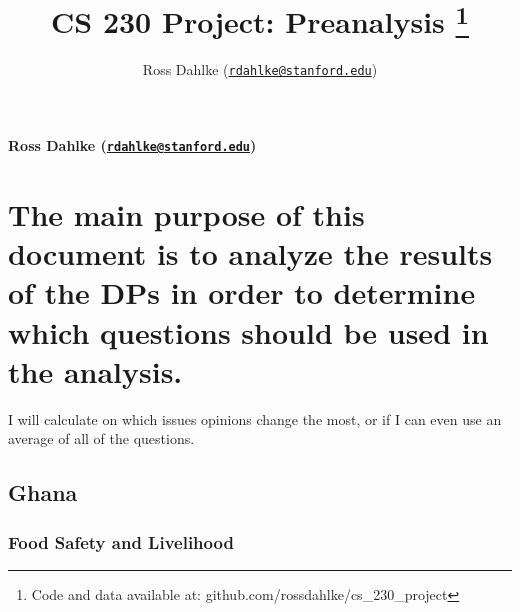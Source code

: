 \documentclass[12pt,]{article}
\title{CS 230 Project: Preanalysis \thanks{Code and data available at: github.com/rossdahlke/cs\_230\_project}  }
\author{\Large Ross Dahlke
(\href{mailto:rdahlke@stanford.edu}{\nolinkurl{rdahlke@stanford.edu}})\vspace{0.05in} \newline\normalsize\emph{}  }
\date{}
\newcommand*{\authorfont}{\fontfamily{phv}\selectfont}
\begin{document}
	
%

{%
\setlength{\parindent}{0pt}
\thispagestyle{plain}
{\fontsize{18}{20}\selectfont\raggedright 
\maketitle  %

}

{
   \vskip 13.5pt\relax \normalsize\fontsize{11}{12} 
\textbf{\authorfont Ross Dahlke
(\href{mailto:rdahlke@stanford.edu}{\nolinkurl{rdahlke@stanford.edu}})} \hskip 15pt \emph{\small }   

}

}






\vskip -8.5pt



\noindent \doublespacing 

\hypertarget{the-main-purpose-of-this-document-is-to-analyze-the-results-of-the-dps-in-order-to-determine-which-questions-should-be-used-in-the-analysis.}{%
\section{The main purpose of this document is to analyze the results of
the DPs in order to determine which questions should be used in the
analysis.}\label{the-main-purpose-of-this-document-is-to-analyze-the-results-of-the-dps-in-order-to-determine-which-questions-should-be-used-in-the-analysis.}}

I will calculate on which issues opinions change the most, or if I can
even use an average of all of the questions.

\hypertarget{ghana}{%
\subsection{Ghana}\label{ghana}}

\hypertarget{food-safety-and-livelihood}{%
\subsubsection{Food Safety and
Livelihood}\label{food-safety-and-livelihood}}
\end{document}
